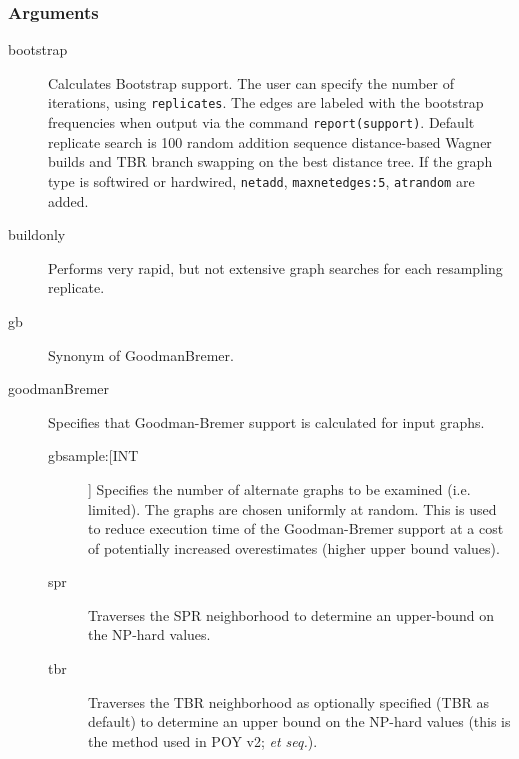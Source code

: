 	\subsubsection{Arguments}
		\begin{description}
		

		\item[bootstrap] Calculates Bootstrap support. The user can specify the number of 
		iterations, using \texttt{replicates}. The edges are labeled with the bootstrap 
		frequencies when output via the command \texttt{report(support)}. Default replicate 
		search is 100 random addition sequence distance-based Wagner builds and TBR 
		branch swapping on the best distance tree. If the graph type is softwired or hardwired, 
		\texttt{netadd}, \texttt{maxnetedges:5}, \texttt{atrandom} are added. 
		
		\item[buildonly] Performs very rapid, but not extensive graph searches for each 
		resampling replicate.
		
		\item[gb] Synonym of GoodmanBremer.
			
		\item[goodmanBremer] Specifies that Goodman-Bremer support is 
		calculated for input graphs. 
			
		\begin{description}
			
			\item[gbsample:[INT]] Specifies the number of alternate graphs to be examined 
			(i.e. limited). The graphs are chosen uniformly at random. This is used to reduce 
			execution time of the Goodman-Bremer support at a cost of potentially increased 
			overestimates (higher upper bound values). 
			
			\item[spr] Traverses the SPR neighborhood to determine an upper-bound on 
			the NP-hard values.
			
			\item[tbr] Traverses the TBR neighborhood 
			as optionally specified (TBR as default) to determine an upper bound on the 
			NP-hard values (this is the method used in POY v2; \citealp{POY2} \textit{et seq.}).
			
		\end{description}
		

\end{description}
